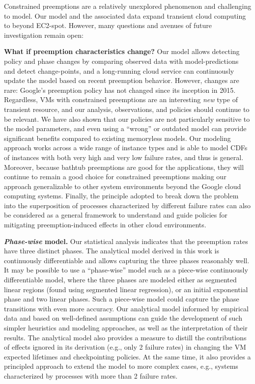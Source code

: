 \documentclass[sigconf]{acmart} %
\begin{document}
Constrained preemptions are a relatively unexplored phenomenon and challenging to model.
Our model and the associated data expand transient cloud computing to beyond EC2-spot.
However, many questions and avenues of future investigation remain open:

\noindent \textbf{What if preemption characteristics change?}
Our model allows detecting policy and phase changes by comparing observed data with model-predictions and detect change-points, and 
a long-running cloud service can continuously update the model based on recent preemption behavior. 
However, changes are rare: Google's preemption policy has not changed since its inception in 2015. 
Regardless, VMs with constrained preemptions are an interesting \emph{new} type of transient resource, and our analysis, observations, and policies should continue to be relevant. 
We have also shown that our policies are not particularly sensitive to the model parameters, and even using a ``wrong'' or outdated model can provide significant benefits compared to existing memoryless models. 
Our modeling approach works across a wide range of instance types and is able to model CDFs of instances with both very high and very low failure rates, and thus is general. Moreover, because bathtub preemptions are good for the applications, they will continue to remain a good choice for constrained preemptions making our approach generalizable to other system environments beyond the Google cloud computing systems. Finally, the principle adopted to break down the problem into the superposition of processes characterized by different failure rates can also be considered as a general framework to understand and guide policies for mitigating preemption-induced effects in other cloud environments.

\noindent \textbf{\emph{Phase-wise} model.}
Our statistical analysis indicates that the preemption rates have three distinct phases. 
The analytical model derived in this work is continuously differentiable and allows capturing the three phases reasonably well. 
It may be possible to use a ``phase-wise'' model such as a piece-wise continuously differentiable model, where the three phases are modeled either as segmented linear regions (found using segmented linear regression), or an initial exponential phase and two linear phases. 
Such a piece-wise model could capture the phase transitions with even more accuracy.
Our analytical model informed by empirical data and based on well-defined assumptions can guide the development of such simpler heuristics and modeling approaches, as well as the interpretation of their results.
The analytical model also provides a measure to distill the contributions of effects ignored in its derivation (e.g., only 2 failure rates) in changing the VM expected lifetimes and checkpointing policies. At the same time, it also provides a principled approach to extend the model to more complex cases, e.g., systems characterized by processes with more than 2 failure rates. 
\end{document}
